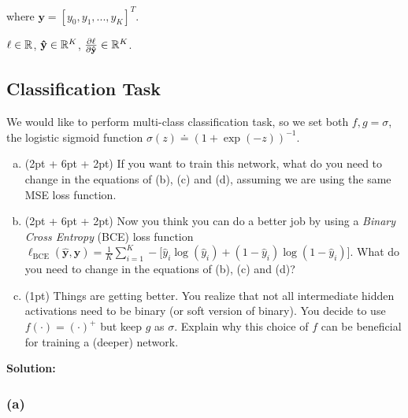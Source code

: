 where $\mathbf{y} = [y_0, y_1, ..., y_K]^T$.

$\ell \in \mathbb{R}$, $\mathbf{\hat{y}} \in \mathbb{R}^{K}$, $\frac{\partial \ell}{\partial \mathbf{\hat{y}}} \in \mathbb{R}^{K} $. 


\subsection{Classification Task}
We would like to perform multi-class classification task, so we set both $f, g = \sigma$, the logistic sigmoid function $\sigma(z) \doteq (1 + \exp(-z))^{-1}$.

\begin{enumerate}[(a)] 
\item
(2pt + 6pt + 2pt) If you want to train this network, what do you need to change in the equations of (b), (c) and (d), assuming we are using the same MSE loss function.

\item
(2pt + 6pt + 2pt) Now you think you can do a better job by using a \emph{Binary Cross Entropy} (BCE) loss function $\ell_\text{BCE}(\bm{\hat{y}}, \bm{y}) = \frac{1}{K}\sum_{i=1}^K -\big[\hat{y}_i \log(\hat{y}_i) + (1 - \hat{y}_i)\log(1 - \hat{y}_i)\big]$.
What do you need to change in the equations of (b), (c) and (d)?

\item
(1pt) Things are getting better.
You realize that not all intermediate hidden activations need to be binary (or soft version of binary).
You decide to use $f(\cdot) = (\cdot)^+$ but keep $g$ as $\sigma$. Explain why this choice of $f$ can be beneficial for training a (deeper) network.


\end{enumerate}

\textbf{Solution:}
\subsubsection{(a)}

